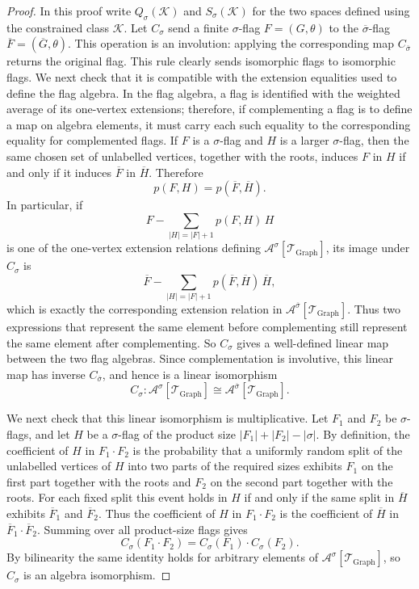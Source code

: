 \documentclass[11pt]{article}
\theoremstyle{definition}
\newcommand{\A}{\mathcal{A}}
\newcommand{\K}{\mathcal{K}}
\newcommand{\T}{\mathcal{T}}
\begin{document}
\begin{proof}
In this proof write $Q_\sigma(\K)$ and $S_\sigma(\K)$ for the two spaces
defined using the constrained class $\K$.
Let $C_\sigma$ send a finite $\sigma$-flag $F=(G,\theta)$ to the
$\overline\sigma$-flag $\overline F=(\overline G,\theta)$.  This operation is
an involution: applying the corresponding map $C_{\overline\sigma}$ returns
the original flag.  This rule clearly sends isomorphic flags to isomorphic
flags.  We next check that it is compatible with the extension equalities used
to define the flag algebra.  In the flag algebra, a flag is identified with
the weighted average of its one-vertex extensions; therefore, if complementing
a flag is to define a map on algebra elements, it must carry each such equality
to the corresponding equality for complemented flags.  If $F$ is a
$\sigma$-flag and $H$ is a larger $\sigma$-flag, then the same chosen set of
unlabelled vertices, together with the roots, induces $F$ in $H$ if and only if
it induces $\overline F$ in $\overline H$.  Therefore
\[
  p(F,H)=p(\overline F,\overline H).
\]
In particular, if
\[
  F-\sum_{|H|=|F|+1}p(F,H)\,H
\]
is one of the one-vertex extension relations defining
$\A^\sigma[\T_{\mathrm{Graph}}]$, its image under $C_\sigma$ is
\[
  \overline F-\sum_{|H|=|F|+1}p(\overline F,\overline H)\,\overline H,
\]
which is exactly the corresponding extension relation in
$\A^{\overline\sigma}[\T_{\mathrm{Graph}}]$.  Thus two expressions that
represent the same element before complementing still represent the same
element after complementing.  So $C_\sigma$ gives a well-defined linear map
between the two flag algebras.  Since complementation is involutive, this
linear map has inverse $C_{\overline\sigma}$, and hence is a linear isomorphism
\[
  C_\sigma:\A^\sigma[\T_{\mathrm{Graph}}]\cong
  \A^{\overline\sigma}[\T_{\mathrm{Graph}}].
\]

We next check that this linear isomorphism is multiplicative.  Let $F_1$ and
$F_2$ be $\sigma$-flags, and let $H$ be a $\sigma$-flag of the product size
$|F_1|+|F_2|-|\sigma|$.  By definition, the coefficient of $H$ in
$F_1\cdot F_2$ is the probability that a uniformly random split of the unlabelled
vertices of $H$ into two parts of the required sizes exhibits $F_1$ on the
first part together with the roots and $F_2$ on the second part together with
the roots.  For each fixed split this event holds in $H$ if and only if the
same split in $\overline H$ exhibits $\overline F_1$ and $\overline F_2$.
Thus the coefficient of $H$ in $F_1\cdot F_2$ is the coefficient of $\overline H$ in
$\overline F_1\cdot\overline F_2$.  Summing over all product-size flags gives
\[
  C_\sigma(F_1\cdot F_2)=C_\sigma(F_1)\cdot C_\sigma(F_2).
\]
By bilinearity the same identity holds for arbitrary elements of
$\A^\sigma[\T_{\mathrm{Graph}}]$, so $C_\sigma$ is an algebra isomorphism.


\end{proof}
\end{document}
